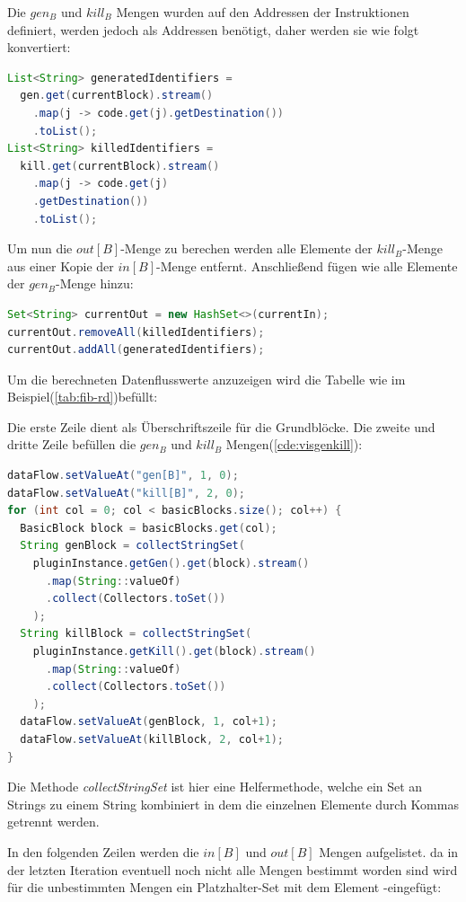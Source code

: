 Die $gen_B$ und $kill_B$ Mengen wurden auf den Addressen der Instruktionen definiert,
werden jedoch als Addressen benötigt, daher werden sie wie folgt konvertiert:

\begin{lstlisting}[language=Java, caption={Konvertierung der $gen$-Menge}, label={cde:genConv}]
List<String> generatedIdentifiers = 
  gen.get(currentBlock).stream()
    .map(j -> code.get(j).getDestination())
    .toList();
List<String> killedIdentifiers = 
  kill.get(currentBlock).stream()
    .map(j -> code.get(j)
    .getDestination())
    .toList();
\end{lstlisting}

Um nun die $out[B]$-Menge zu berechen werden alle Elemente der $kill_B$-Menge aus
einer Kopie der $in[B]$-Menge entfernt. Anschließend fügen wie alle Elemente der
$gen_B$-Menge hinzu:
\begin{lstlisting}[language=Java, caption={Berechnung der $out$-Menge}, label={cde:rdOut}]
Set<String> currentOut = new HashSet<>(currentIn);
currentOut.removeAll(killedIdentifiers);
currentOut.addAll(generatedIdentifiers);
\end{lstlisting}

Um die berechneten Datenflusswerte anzuzeigen wird die Tabelle 
wie im Beispiel(\cref{tab:fib-rd})befüllt:

Die erste Zeile dient als Überschriftszeile für die Grundblöcke.
Die zweite und dritte Zeile befüllen die $gen_B$ und $kill_B$ Mengen(\cref{cde:visgenkill}):
\begin{lstlisting}[language=Java, caption={Berechnung der $out$-Menge}, label={cde:visgenkill}]
dataFlow.setValueAt("gen[B]", 1, 0);
dataFlow.setValueAt("kill[B]", 2, 0);
for (int col = 0; col < basicBlocks.size(); col++) {
  BasicBlock block = basicBlocks.get(col);
  String genBlock = collectStringSet(
    pluginInstance.getGen().get(block).stream()
      .map(String::valueOf)
      .collect(Collectors.toSet())
    );
  String killBlock = collectStringSet(
    pluginInstance.getKill().get(block).stream()
      .map(String::valueOf)
      .collect(Collectors.toSet())
    );
  dataFlow.setValueAt(genBlock, 1, col+1);
  dataFlow.setValueAt(killBlock, 2, col+1);
}
\end{lstlisting}
Die Methode \textit{collectStringSet} ist hier eine Helfermethode, welche ein
Set an Strings zu einem String kombiniert in dem die einzelnen Elemente durch Kommas getrennt werden.

In den folgenden Zeilen werden die $in[B]$ und $out[B]$ Mengen aufgelistet.
da in der letzten Iteration eventuell noch nicht alle Mengen bestimmt worden sind
wird für die unbestimmten Mengen ein Platzhalter-Set mit dem Element \glqq -\grqq  eingefügt:


